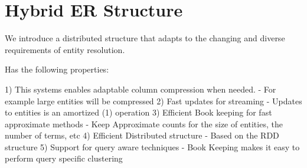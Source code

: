 
\section{Hybrid ER Structure}


% 



We introduce a distributed structure that adapts to the changing and diverse requirements 
of entity resolution.

Has the following properties:

1) This systems enables adaptable column compression when needed.
  - For example large entities will be compressed
2) Fast updates for streaming 
  - Updates to entities is an amortized \Theta(1) operation
3) Efficient Book keeping for fast approximate methods
  - Keep Approximate counts for the size of entities, the number of terms, etc
4) Efficient Distributed structure
  - Based on the RDD structure
5) Support for query aware techniques
  - Book Keeping makes it easy to perform query specific clustering



